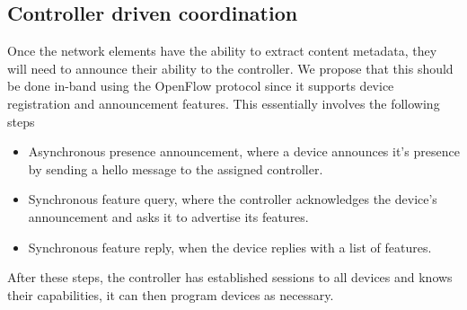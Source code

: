 \documentclass[conference]{IEEEtran}
\begin{document}
\subsection{Controller driven coordination}
Once the network elements have the ability to extract content
metadata, they will need to announce their ability to the
controller. We propose that this should be done in-band using
the OpenFlow protocol since it supports device registration and
announcement features. This essentially involves the following
steps
\begin{itemize}
\item Asynchronous presence announcement, where a device announces it's presence by sending a hello message to the assigned controller.
\item Synchronous feature query, where the controller acknowledges the device's announcement and asks it to advertise its features.
\item Synchronous feature reply, when the device replies with a list of features.
\end{itemize}
After these steps, the controller has established sessions to all devices and knows their capabilities, it can then program devices as necessary.
\end{document}
